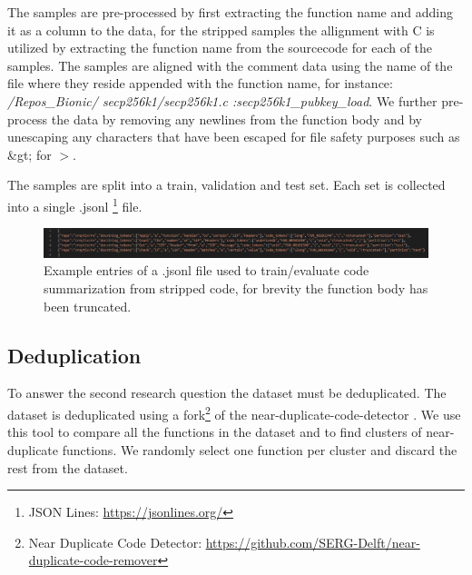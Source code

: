 The samples are pre-processed by first extracting the function name and adding it as a column to the data, for the stripped samples the allignment with C is utilized by extracting the function name from the sourcecode for each of the samples. The samples are aligned with the comment data using the name of the file where they reside appended with the function name, for instance: \textit{/Repos\_Bionic/ secp256k1/secp256k1.c :secp256k1\_pubkey\_load}. We further pre-process the data by removing any newlines from the function body and by unescaping any characters that have been escaped for file safety purposes such as \&gt; for $>$.

The samples are split into a train, validation and test set. Each set is collected into a single .jsonl \footnote{JSON Lines: \url{https://jsonlines.org/}} file.

\label{fig:jsonl}
\begin{figure}[H]
  \centering
  \includegraphics[width=\linewidth]{img/jsonl.png}
  \caption{Example entries of a .jsonl file used to train/evaluate code summarization from stripped code, for brevity the function body has been truncated.}
\end{figure}

\subsection{Deduplication}


To answer the second research question the dataset must be deduplicated. The dataset is deduplicated using a fork\footnote{Near Duplicate Code Detector: \url{https://github.com/SERG-Delft/near-duplicate-code-remover}} of the near-duplicate-code-detector \cite{allamanis_adverse}. We use this tool to compare all the functions in the dataset and to find clusters of near-duplicate functions. We randomly select one function per cluster and discard the rest from the dataset. 

